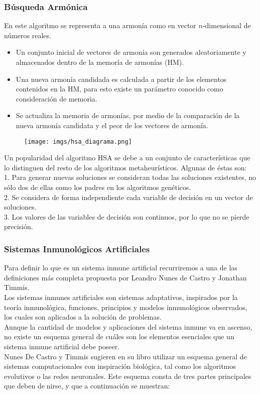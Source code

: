 \documentclass{article}
\begin{document}
\subsubsection{B\'usqueda Arm\'onica}
En este algoritmo se representa a una armonía como en vector $n$-dimensional de números reales.
\begin{itemize}
    \item Un conjunto inicial de vectores de armonía son generados aleatoriamente y almacenados dentro de la memoría de armonías (HM).
    \item Una nueva armonía candidada es calculada a partir de los elementos contenidos en la HM, para esto existe un parámetro conocido como consideración de memoria.
    \item Se actualiza la memoria de armonías, por medio de la comparación de la nueva armonía candidata y el peor de los vectores de armonía. 
\end{itemize}
\begin{figure}[H]
    \centering
    \texttt{[image: imgs/hsa\_diagrama.png]}
\end{figure}
Un popularidad del algoritmo HSA se debe a un conjunto de características que lo distinguen del resto de los algoritmos metaheurísticos. Algunas de éstas son: \\ 
1. Para generar nuevas soluciones se consideran todas las soluciones existentes, no sólo dos de ellas como los padres en los algoritmos genéticos. \\ 
2. Se considera de forma independiente cada variable de decisión en un vector de soluciones. \\
3. Los valores de las variables de decisión son continuos, por lo que no se pierde precisión.

\subsubsection{Sistemas Inmunológicos Artificiales}
Para definir lo que es un sistema inmune artificial recurriremos a una de
las definiciones más completa propuesta por Leandro Nunes de Castro y
Jonathan Timmis. \\Los sistemas inmunes artificiales son sistemas adaptativos, inspirados por la teoría inmunológica, funciones, principios y modelos inmunológicos observados, los cuales son aplicados a la
solución de problemas.\\
Aunque la cantidad de modelos y aplicaciones del sistema inmune va en
ascenso, no existe un esquema general de cuáles son los elementos esenciales
que un sistema inmune artificial debe poseer. \\
Nunes De Castro y Timmis sugieren en su libro utilizar un esquema
general de sistemas computacionales con inspiración biológica, tal como los
algoritmos evolutivos o las redes neuronales. Este esquema consta de tres
partes principales que deben denirse, y que a continuación se muestran:
\end{document}
